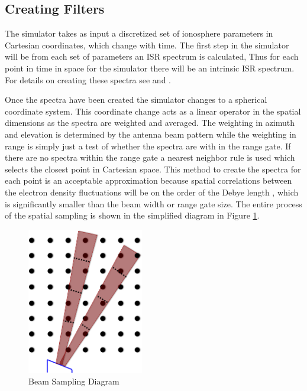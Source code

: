 \documentclass[draft,ras]{agutex}
\begin{document}
\begin{article}
\subsection{Creating Filters}

The simulator takes as input a discretized set of ionosphere parameters in Cartesian coordinates, which change with time. The first step in the simulator will be from each set of parameters an ISR spectrum is calculated, Thus for each point in time in space for the simulator there will be an intrinsic ISR spectrum. For details on creating these spectra see \citet{kudeki:milla:1} and \citet{kudeki:milla:2}. 

Once the spectra have been created the simulator changes to a spherical coordinate system. This coordinate change acts as a linear operator in the spatial dimensions as the spectra are weighted and averaged. The weighting in azimuth and elevation is determined by the antenna beam pattern while the weighting in range is simply just a test of whether the spectra are with in the range gate. If there are no spectra within the range gate a nearest neighbor rule is used which selects the closest point in Cartesian space. This method to create the spectra for each point is an acceptable approximation because spatial correlations between the electron density fluctuations will be on the order of the Debye length \citep{farley1969}, which is significantly smaller than the beam width or range gate size. The entire process of the spatial sampling is shown in the simplified diagram in Figure \ref{fig:beamdia}.

\begin{figure}[!t]
\centering
\includegraphics[width=2in]{beamsampling}
\caption{Beam Sampling Diagram}
\label{fig:beamdia}
\end{figure}
 


\end{article}
\end{document}
